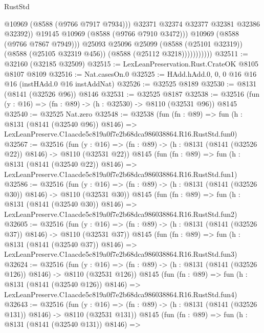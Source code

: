 \begin{lexlean}{RustStd}
\begin{coremodule}
                                @10969
                                (@8588 (@9766 @7917 @7934)))
                              @32371
                              @32374
                              @32377
                              @32381
                              @32386
                              @32392))
                          @19145
                          @10969
                          (@8588 (@9766 @7910 @3472)))
                        @10969
                        (@8588 (@9766 @7867 @7949)))
                      @25093
                      @25096
                      @25099
                      (@8588 (@25101 @32319))
                      (@8588 (@25105 @32319 @456))
                      (@8588 (@25112 @3218)))))))))))
@32511 := @32160 (@32185 @32509)
@32515 := LexLeanPreservation.Rust.CrateOK @8105 @8107 @8109
@32516 := Nat.casesOn.{0}
@32525 := HAdd.hAdd.{0, 0, 0} @16 @16 @16 (instHAdd.{0} @16 instAddNat)
@32526 := @32525 @8189
@32530 := @8131 (@8141 (@32526 @96)) @8146
@32531 := @32525 @8187
@32538 := @32516 (fun (y : @16) => (fn : @89) -> (h : @32530) -> @8110 (@32531 @96)) @8145
@32540 := @32525 Nat.zero
@32548 := @32538
    (fun (fn : @89) =>
    fun (h : @8131 (@8141 (@32540 @96)) @8146) =>
    LexLeanPreserve.C1aacde5c819a0f7e2b68dca986038864.R16.RustStd.fun0)
@32567 := @32516
    (fun (y : @16) => (fn : @89) -> (h : @8131 (@8141 (@32526 @22)) @8146) -> @8110 (@32531 @22))
    @8145
    (fun (fn : @89) =>
    fun (h : @8131 (@8141 (@32540 @22)) @8146) =>
    LexLeanPreserve.C1aacde5c819a0f7e2b68dca986038864.R16.RustStd.fun1)
@32586 := @32516
    (fun (y : @16) => (fn : @89) -> (h : @8131 (@8141 (@32526 @30)) @8146) -> @8110 (@32531 @30))
    @8145
    (fun (fn : @89) =>
    fun (h : @8131 (@8141 (@32540 @30)) @8146) =>
    LexLeanPreserve.C1aacde5c819a0f7e2b68dca986038864.R16.RustStd.fun2)
@32605 := @32516
    (fun (y : @16) => (fn : @89) -> (h : @8131 (@8141 (@32526 @37)) @8146) -> @8110 (@32531 @37))
    @8145
    (fun (fn : @89) =>
    fun (h : @8131 (@8141 (@32540 @37)) @8146) =>
    LexLeanPreserve.C1aacde5c819a0f7e2b68dca986038864.R16.RustStd.fun3)
@32624 := @32516
    (fun (y : @16) => (fn : @89) -> (h : @8131 (@8141 (@32526 @126)) @8146) -> @8110 (@32531 @126))
    @8145
    (fun (fn : @89) =>
    fun (h : @8131 (@8141 (@32540 @126)) @8146) =>
    LexLeanPreserve.C1aacde5c819a0f7e2b68dca986038864.R16.RustStd.fun4)
@32643 := @32516
    (fun (y : @16) => (fn : @89) -> (h : @8131 (@8141 (@32526 @131)) @8146) -> @8110 (@32531 @131))
    @8145
    (fun (fn : @89) =>
    fun (h : @8131 (@8141 (@32540 @131)) @8146) =>

\end{coremodule}
\end{lexlean}
